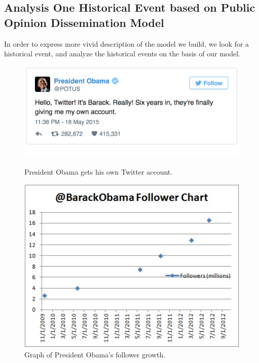 \documentclass[a4paper,11pt]{article}
\begin{document}
\subsection{Analysis One Historical Event based on Public Opinion Dissemination Model}
\par In order to express more vivid description of the model we build, we look for a historical event, and analyze the historical events on the basis of our model.



\begin{figure}[!h]
  \centering %
  \begin{minipage}[t]{.49\linewidth}
  \includegraphics[width=1\textwidth]{./Pic/obama.png}
  \caption{President Obama gets his own Twitter account.}
  \end{minipage}
  \begin{minipage}[t]{.49\linewidth}
  \includegraphics[width=1\textwidth]{./Pic/p5.jpg}
  \caption{Graph of President Obama's follower growth.\cite{RG}}
  \label{fig:p5}
  \end{minipage}
\end{figure}
\end{document}
